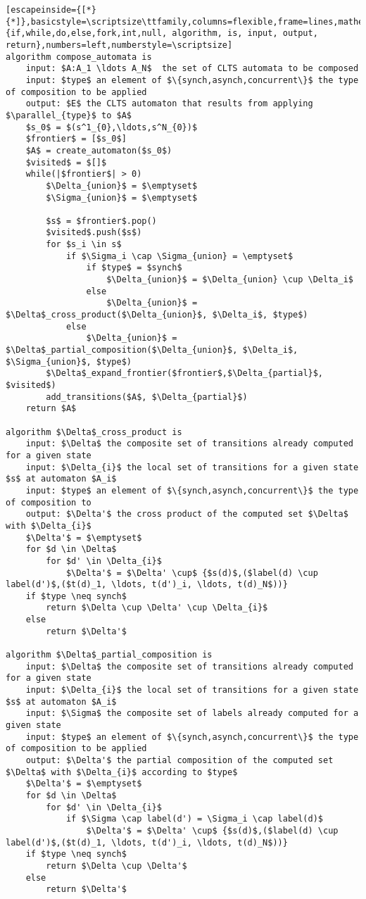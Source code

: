 \renewcommand{\ttdefault}{pcr}
\begin{lstlisting}[escapeinside={[*}{*]},basicstyle=\scriptsize\ttfamily,columns=flexible,frame=lines,mathescape=true,xleftmargin=3.0ex,keywordstyle=\textbf,morekeywords={if,while,do,else,fork,int,null, algorithm, is, input, output, return},numbers=left,numberstyle=\scriptsize]
algorithm compose_automata is
	input: $A:A_1 \ldots A_N$  the set of CLTS automata to be composed
	input: $type$ an element of $\{synch,asynch,concurrent\}$ the type of composition to be applied
	output: $E$ the CLTS automaton that results from applying $\parallel_{type}$ to $A$
	$s_0$ = $(s^1_{0},\ldots,s^N_{0})$
	$frontier$ = [$s_0$]
	$A$ = create_automaton($s_0$)
	$visited$ = $[]$
	while(|$frontier$| > 0)
		$\Delta_{union}$ = $\emptyset$
		$\Sigma_{union}$ = $\emptyset$		
		
		$s$ = $frontier$.pop()
		$visited$.push($s$)
		for $s_i \in s$ 
			if $\Sigma_i \cap \Sigma_{union} = \emptyset$		
				if $type$ = $synch$
					$\Delta_{union}$ = $\Delta_{union} \cup \Delta_i$
				else
					$\Delta_{union}$ = $\Delta$_cross_product($\Delta_{union}$, $\Delta_i$, $type$)
			else
				$\Delta_{union}$ = $\Delta$_partial_composition($\Delta_{union}$, $\Delta_i$, $\Sigma_{union}$, $type$)
		$\Delta$_expand_frontier($frontier$,$\Delta_{partial}$, $visited$)				
		add_transitions($A$, $\Delta_{partial}$)
	return $A$

algorithm $\Delta$_cross_product is
	input: $\Delta$ the composite set of transitions already computed for a given state
	input: $\Delta_{i}$ the local set of transitions for a given state $s$ at automaton $A_i$
	input: $type$ an element of $\{synch,asynch,concurrent\}$ the type of composition to	
	output: $\Delta'$ the cross product of the computed set $\Delta$ with $\Delta_{i}$
	$\Delta'$ = $\emptyset$
	for $d \in \Delta$
		for $d' \in \Delta_{i}$
			$\Delta'$ = $\Delta' \cup$ {$s(d)$,($label(d) \cup label(d')$,($t(d)_1, \ldots, t(d')_i, \ldots, t(d)_N$))}
	if $type \neq synch$
		return $\Delta \cup \Delta' \cup \Delta_{i}$
	else
		return $\Delta'$
	
algorithm $\Delta$_partial_composition is
	input: $\Delta$ the composite set of transitions already computed for a given state
	input: $\Delta_{i}$ the local set of transitions for a given state $s$ at automaton $A_i$
	input: $\Sigma$ the composite set of labels already computed for a given state		
	input: $type$ an element of $\{synch,asynch,concurrent\}$ the type of composition to be applied
	output: $\Delta'$ the partial composition of the computed set $\Delta$ with $\Delta_{i}$ according to $type$
	$\Delta'$ = $\emptyset$
	for $d \in \Delta$
		for $d' \in \Delta_{i}$
			if $\Sigma \cap label(d') = \Sigma_i \cap label(d)$
				$\Delta'$ = $\Delta' \cup$ {$s(d)$,($label(d) \cup label(d')$,($t(d)_1, \ldots, t(d')_i, \ldots, t(d)_N$))}
	if $type \neq synch$
		return $\Delta \cup \Delta'$	
	else
		return $\Delta'$
				

\end{lstlisting}